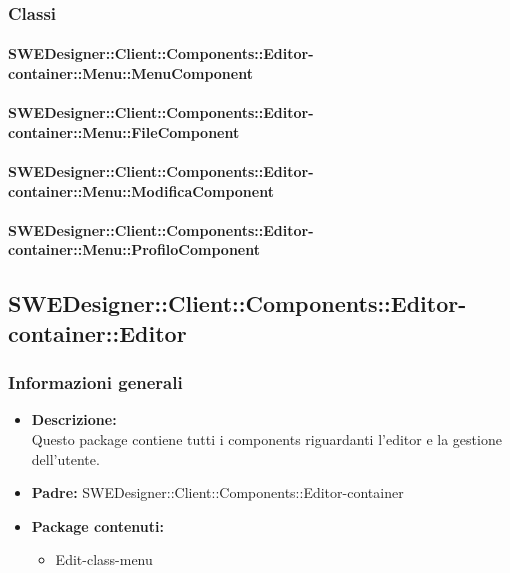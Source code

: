           \subsubsection{Classi}
          
          	\paragraph{SWEDesigner::Client::Components::Editor-container::Menu::MenuComponent}
				
				
          	\paragraph{SWEDesigner::Client::Components::Editor-container::Menu::FileComponent}
				
				
          	\paragraph{SWEDesigner::Client::Components::Editor-container::Menu::ModificaComponent}
				
				
          	\paragraph{SWEDesigner::Client::Components::Editor-container::Menu::ProfiloComponent}
				
				
	\subsection{SWEDesigner::Client::Components::Editor-container::Editor}
		\subsubsection{Informazioni generali}
			\begin{itemize}
          		\item \textbf{Descrizione:}\\
          		Questo package contiene tutti i components riguardanti l'editor e la gestione dell'utente.
          		\item \textbf{Padre:} SWEDesigner::Client::Components::Editor-container
          		\item \textbf{Package contenuti:}\\
          		\begin{itemize}
          			\item Edit-class-menu\\
          		\end{itemize}
          	\end{itemize}
          	
